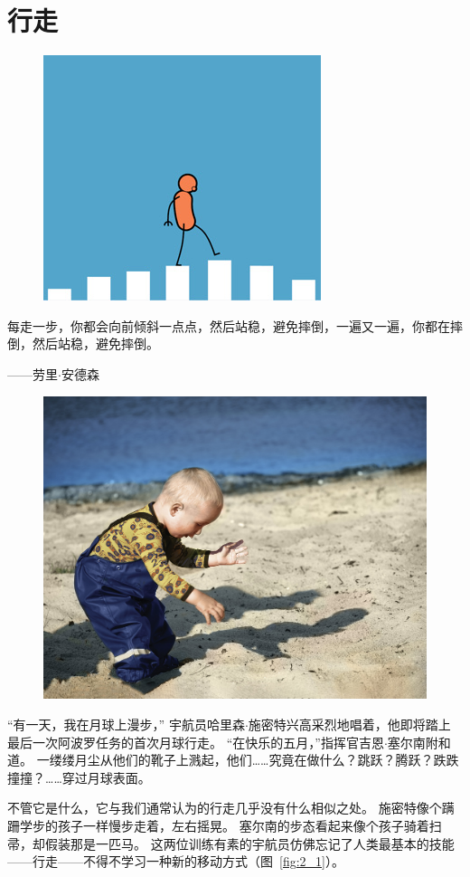\chapter{行走} \label{chap:chap2}

\begin{figure}[!htb]
	\centering
	\includegraphics[width=0.5\linewidth]{chap2/2_0}
	\caption*{ \label{fig:2_0}}
\end{figure}

每走一步，你都会向前倾斜一点点，然后站稳，避免摔倒，一遍又一遍，你都在摔倒，然后站稳，避免摔倒。

\begin{flushright}
	——劳里$\cdot$安德森 \\
\end{flushright}

\begin{figure}[!htb]
	\centering
	\includegraphics[width=0.5\linewidth]{chap2/2_0_2}
	\caption*{ \label{fig:2_0_2}}
\end{figure}

“有一天，我在月球上漫步，”
宇航员哈里森$\cdot$施密特兴高采烈地唱着，他即将踏上最后一次阿波罗任务的首次月球行走。
“在快乐的五月，”指挥官吉恩$\cdot$塞尔南附和道。
一缕缕月尘从他们的靴子上溅起，他们……究竟在做什么？跳跃？腾跃？跌跌撞撞？……穿过月球表面。


不管它是什么，它与我们通常认为的行走几乎没有什么相似之处。
施密特像个蹒跚学步的孩子一样慢步走着，左右摇晃。
塞尔南的步态看起来像个孩子骑着扫帚，却假装那是一匹马。
这两位训练有素的宇航员仿佛忘记了人类最基本的技能——行走——不得不学习一种新的移动方式（图~\ref{fig:2_1}）。


